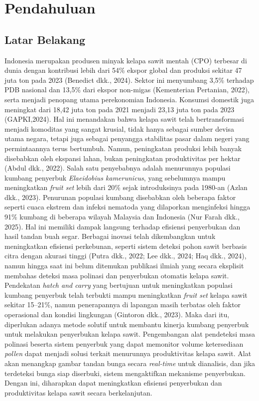 \chapter{Pendahuluan}
\label{chap:pendahuluan}

\section{Latar Belakang}
\label{sec:latar-belakang}
Indonesia merupakan produsen minyak kelapa sawit mentah (CPO) terbesar di dunia
dengan kontribusi lebih dari 54\% ekspor global dan produksi sekitar 47 juta ton pada 2023
(Benedict dkk., 2024). Sektor ini menyumbang 3,5\% terhadap PDB nasional dan 13,5\% dari
ekspor non-migas (Kementerian Pertanian, 2022), serta menjadi penopang utama
perekonomian Indonesia. Konsumsi domestik juga meningkat dari 18,42 juta ton pada 2021
menjadi 23,13 juta ton pada 2023 (GAPKI,2024). Hal ini menandakan bahwa kelapa sawit telah bertransformasi menjadi komoditas yang sangat krusial, tidak hanya sebagai sumber devisa utama negara, tetapi juga sebagai penyangga stabilitas pasar dalam negeri yang permintaannya terus bertumbuh.
Namun, peningkatan produksi lebih banyak disebabkan oleh ekspansi lahan, bukan
peningkatan produktivitas per hektar (Abdul dkk., 2022). Salah satu penyebabnya adalah
menurunnya populasi kumbang penyerbuk \emph{Elaeidobius kamerunicus}, yang sebelumnya mampu
meningkatkan \emph{fruit set} lebih dari 20\% sejak introduksinya pada 1980-an (Azlan dkk., 2023).
Penurunan populasi kumbang disebabkan oleh beberapa faktor seperti cuaca ekstrem dan
infeksi nematoda yang dilaporkan menginfeksi hingga 91\% kumbang di beberapa wilayah
Malaysia dan Indonesia (Nur Farah dkk., 2025). Hal ini memiliki dampak langsung terhadap
efisiensi penyerbukan dan hasil tandan buah segar.
Berbagai inovasi telah dikembangkan untuk meningkatkan efisiensi perkebunan, seperti
sistem deteksi pohon sawit berbasis citra dengan akurasi tinggi (Putra dkk., 2022; Lee dkk.,
2024; Haq dkk., 2024), namun hingga saat ini belum ditemukan publikasi ilmiah yang secara
eksplisit membahas deteksi masa polinasi dan penyerbukan otomatis kelapa sawit. Pendekatan
\emph{hatch and carry} yang bertujuan untuk meningkatkan populasi kumbang penyerbuk telah
terbukti mampu meningkatkan \emph{fruit set} kelapa sawit sekitar 15–21\%, namun penerapannya di
lapangan masih terbatas oleh faktor operasional dan kondisi lingkungan (Gintoron dkk., 2023).
Maka dari itu, diperlukan adanya metode solutif untuk membantu kinerja kumbang
penyerbuk untuk melakukan penyerbukan kelapa sawit. Pengembangan alat pendeteksi masa
polinasi beserta sistem penyerbuk yang dapat memonitor volume ketersediaan \emph{pollen} dapat
menjadi solusi terkait menurunnya produktivitas kelapa sawit. Alat akan menangkap gambar
tandan bunga secara \emph{real-time} untuk dianalisis, dan jika terdeteksi bunga siap diserbuki, sistem
mengaktifkan mekanisme penyerbukan. Dengan ini, diharapkan dapat meningkatkan efisiensi
penyerbukan dan produktivitas kelapa sawit secara berkelanjutan.


